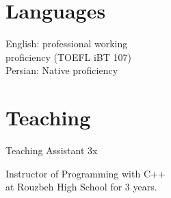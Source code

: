 \documentclass[]{deedy-resume-openfont}
\begin{document}
\begin{minipage}[t]{0.33\textwidth}

%
%
\section{Languages}
English: professional working \\proficiency (TOEFL iBT 107) \\
Persian: Native proficiency

\section{Teaching}
    \vspace{\topsep} %
\begin{tightemize}
\item Teaching Assistant 3x
\item Instructor of Programming with C++ \\at Rouzbeh High School for 3 years.
\end{tightemize}


\end{minipage}
\hfill
\end{document}
